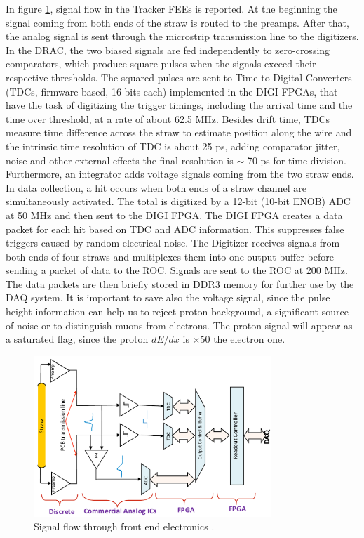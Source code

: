 In figure \ref{fig:flowfee}, signal flow in the Tracker FEEs is reported. At the beginning the signal coming from both ends of the straw is routed to the preamps. After that, the analog signal is sent through the microstrip transmission line to the digitizers. In the DRAC, the two biased signals are fed independently to zero-crossing comparators, which produce square pulses when the signals exceed their respective thresholds. The squared pulses are sent to Time-to-Digital Converters (TDCs, firmware based, 16 bits each) implemented in the DIGI FPGAs, that have the task of digitizing the trigger timings, including the arrival time and the time over threshold, at a rate of about 62.5 MHz. Besides drift time, TDCs measure time difference across the straw to estimate position along the wire and the intrinsic time resolution of TDC is about 25 ps, adding comparator jitter, noise and other external effects the final resolution is $\sim$ 70 ps for time division. Furthermore, an integrator adds voltage signals coming from the two straw ends. In data collection, a hit occurs when both ends of a straw channel are simultaneously activated. The total is digitized by a 12-bit (10-bit ENOB) ADC at 50 MHz and then sent to the DIGI FPGA. The DIGI FPGA creates a data packet for each hit based on TDC and ADC information. This suppresses false triggers caused by random electrical noise. The Digitizer receives signals from both ends of four straws and multiplexes them into one output buffer before sending a packet of data to the ROC. Signals are sent to the ROC at 200 MHz. The data packets are then briefly stored in DDR3 memory for further use by the DAQ system. It is important to save also the voltage signal, since the pulse height information can help us to reject proton background, a significant source of noise or to distinguish muons from electrons. The proton signal will appear as a saturated flag, since the proton $dE/dx$ is $\times$50 the electron one.
\begin{figure}[!h]
\centering
\includegraphics[width =0.8\textwidth]{images/chapter3/Screenshot_20240203_135048.png}
\caption{Signal flow through front end electronics \cite{bartoszek2015mu2e}.}
\label{fig:flowfee}
\end{figure}

